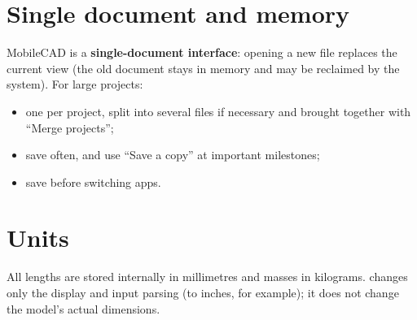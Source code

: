 \section{Single document and memory}

MobileCAD is a \textbf{single-document interface}: opening a new file replaces the current view (the old document
stays in memory and may be reclaimed by the system). For large projects:
\begin{itemize}
  \item one  per project, split into several files if necessary and brought together with ``Merge projects'';
  \item save often, and use ``Save a copy'' at important milestones;
  \item save before switching apps.
\end{itemize}

\section{Units}

All lengths are stored internally in millimetres and masses in kilograms. 
changes only the display and input parsing (to inches, for example); it does not change the model's actual dimensions.
